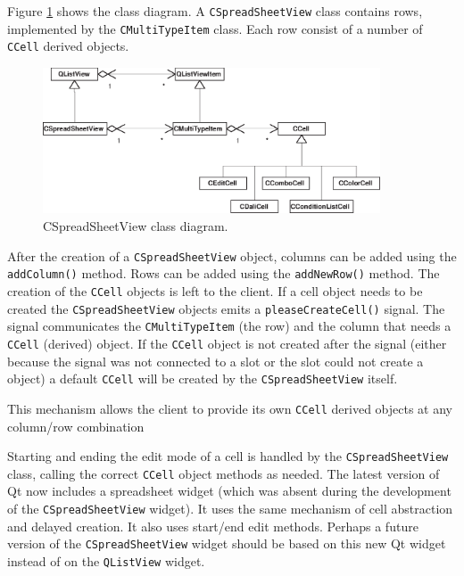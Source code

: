 Figure \ref{fig:uidesign:spreadsheet_class} shows the class diagram. A
\verb=CSpreadSheetView= class contains rows, implemented by the
\verb=CMultiTypeItem= class. Each row consist of a number of \verb=CCell=
derived objects.

\begin{figure} \begin{center}
\includegraphics[width=10cm]{./figures/spreadsheet_class.eps}
\caption{CSpreadSheetView class diagram.}
\label{fig:uidesign:spreadsheet_class}
\end{center} \end{figure}


\bigskip \noindent
After the creation of a \verb=CSpreadSheetView= object, columns can be added
using the \verb=addColumn()= method. Rows can be added using the
\verb=addNewRow()= method. The creation of the \verb=CCell= objects is left to
the client. If a cell object needs to be created the \verb=CSpreadSheetView=
objects emits a \verb=pleaseCreateCell()= signal. The signal communicates the
\verb=CMultiTypeItem= (the row) and the column that needs a \verb=CCell=
(derived) object. If the \verb=CCell= object is not created after the signal
(either because the signal was not connected to a slot or the slot could not
create a object) a default \verb=CCell= will be created by the
\verb=CSpreadSheetView= itself.

This mechanism allows the client to provide its own \verb=CCell= derived
objects at any column/row combination

\bigskip \noindent
Starting and ending the edit mode of a cell is handled by the
\verb=CSpreadSheetView= class, calling the correct \verb=CCell= object methods
as needed. The latest version of Qt now includes a spreadsheet widget (which
was absent during the development of the \verb=CSpreadSheetView= widget). It
uses the same mechanism of cell abstraction and delayed creation. It also uses
start/end edit methods. Perhaps a future version of the \verb=CSpreadSheetView=
widget should be based on this new Qt widget instead of on the \verb=QListView=
widget.

